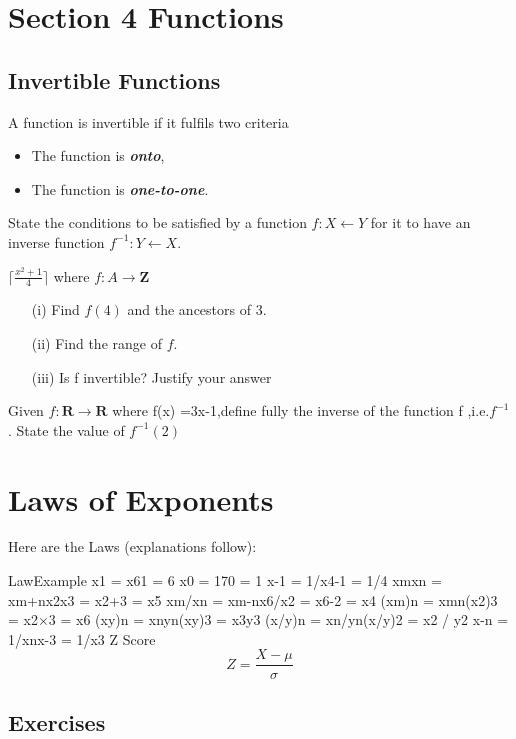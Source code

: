 \documentclass[]{report}
\begin{document}
\section{Section 4 Functions}

\subsection{Invertible Functions}
A function is invertible if it fulfils two criteria
\begin{itemize}
\item The function is \textbf{\textit{onto}},
\item The function is \textbf{\textit{one-to-one}}.
\end{itemize}

State the conditions to be satisfied by a function
$f : X \leftarrow Y$ for it to have an inverse function
$f^{-1} : Y \leftarrow X$.

$\lceil \frac{x^2+1}{4} \rceil$
where $f : A \rightarrow \textbf{Z}$
\begin{itemize}
\item[(i)] Find $f(4)$ and the ancestors of 3.
\item[(ii)] Find the range of $f$.
\item[(iii)] Is f invertible? Justify your answer
\end{itemize}

Given $f : \textbf{R} \rightarrow \textbf{R}$ where f(x) =3x-1,define fully
the inverse of the function f ,i.e.$f^{-1}$. 
State the value of $f^{-1}(2)$



\section{Laws of Exponents}
Here are the Laws (explanations follow):

LawExample
x1 = x61 = 6
x0 = 170 = 1
x-1 = 1/x4-1 = 1/4
xmxn = xm+nx2x3 = x2+3 = x5
xm/xn = xm-nx6/x2 = x6-2 = x4
(xm)n = xmn(x2)3 = x2×3 = x6
(xy)n = xnyn(xy)3 = x3y3
(x/y)n = xn/yn(x/y)2 = x2 / y2
x-n = 1/xnx-3 = 1/x3
Z Score
\[ Z = \frac{X - \mu}{\sigma} \]






\subsection{Exercises}
\end{document}
